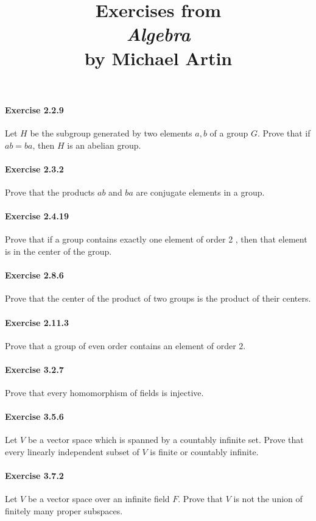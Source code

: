\documentclass{article}
\title{\textbf{
Exercises from \\
\textit{Algebra} \\
by Michael Artin
}}
\date{}
\begin{document}
\maketitle


\paragraph{Exercise 2.2.9} Let $H$ be the subgroup generated by two elements $a, b$ of a group $G$. Prove that if $a b=b a$, then $H$ is an abelian group.


\paragraph{Exercise 2.3.2} Prove that the products $a b$ and $b a$ are conjugate elements in a group.


\paragraph{Exercise 2.4.19} Prove that if a group contains exactly one element of order 2 , then that element is in the center of the group.


\paragraph{Exercise 2.8.6} Prove that the center of the product of two groups is the product of their centers.


\paragraph{Exercise 2.11.3} Prove that a group of even order contains an element of order $2 .$


\paragraph{Exercise 3.2.7} Prove that every homomorphism of fields is injective.


\paragraph{Exercise 3.5.6} Let $V$ be a vector space which is spanned by a countably infinite set. Prove that every linearly independent subset of $V$ is finite or countably infinite.


\paragraph{Exercise 3.7.2} Let $V$ be a vector space over an infinite field $F$. Prove that $V$ is not the union of finitely many proper subspaces.
\end{document}
